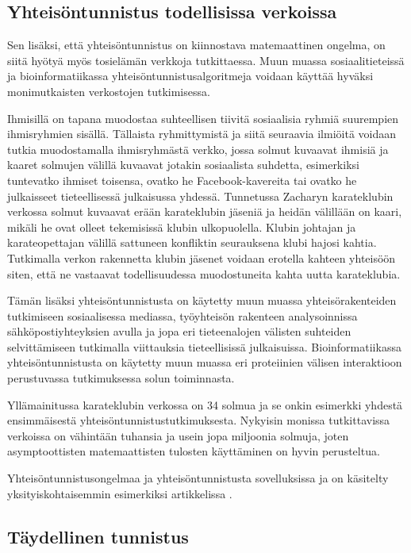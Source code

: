 \documentclass[finnish,12pt,a4paper,pdftex,sci,utf8]{aaltothesis}
\begin{document}
\subsection{Yhteisöntunnistus todellisissa verkoissa}

Sen lisäksi, että yhteisöntunnistus on kiinnostava matemaattinen ongelma, on siitä hyötyä myös tosielämän verkkoja tutkittaessa. Muun muassa sosiaalitieteissä ja bioinformatiikassa yhteisöntunnistusalgoritmeja voidaan käyttää hyväksi monimutkaisten verkostojen tutkimisessa.

Ihmisillä on tapana muodostaa suhteellisen tiivitä sosiaalisia ryhmiä suurempien ihmisryhmien sisällä. Tällaista ryhmittymistä ja siitä seuraavia ilmiöitä voidaan tutkia muodostamalla ihmisryhmästä verkko, jossa solmut kuvaavat ihmisiä ja kaaret solmujen välillä kuvaavat jotakin sosiaalista suhdetta, esimerkiksi tuntevatko ihmiset toisensa, ovatko he Facebook-kavereita tai ovatko he julkaisseet tieteellisessä julkaisussa yhdessä. Tunnetussa Zacharyn karateklubin verkossa solmut kuvaavat erään karateklubin jäseniä ja heidän välillään on kaari, mikäli he ovat olleet tekemisissä klubin ulkopuolella. Klubin johtajan ja karateopettajan välillä sattuneen konfliktin seurauksena klubi hajosi kahtia. Tutkimalla verkon rakennetta klubin jäsenet voidaan erotella kahteen yhteisöön siten, että ne vastaavat todellisuudessa muodostuneita kahta uutta karateklubia.

Tämän lisäksi yhteisöntunnistusta on käytetty muun muassa yhteisörakenteiden tutkimiseen sosiaalisessa mediassa, työyhteisön rakenteen analysoinnissa sähköpostiyhteyksien avulla ja jopa eri tieteenalojen välisten suhteiden selvittämiseen tutkimalla viittauksia tieteellisissä julkaisuissa. Bioinformatiikassa yhteisöntunnistusta on käytetty muun muassa eri proteiinien välisen interaktioon perustuvassa tutkimuksessa solun toiminnasta.

Yllämainitussa karateklubin verkossa on 34 solmua ja se onkin esimerkki yhdestä ensimmäisestä yhteisöntunnistustutkimuksesta. Nykyisin monissa tutkittavissa verkoissa on vähintään tuhansia ja usein jopa miljoonia solmuja, joten asymptoottisten matemaattisten tulosten käyttäminen on hyvin perusteltua.

Yhteisöntunnistusongelmaa ja yhteisöntunnistusta sovelluksissa ja on käsitelty yksityiskohtaisemmin esimerkiksi artikkelissa \cite{Fortunato}.

\subsection{Täydellinen tunnistus}
\end{document}

